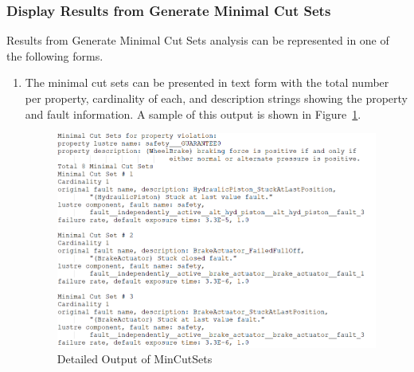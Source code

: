 \subsubsection{Display Results from Generate Minimal Cut Sets}
Results from Generate Minimal Cut Sets analysis can be represented in one of the following forms. 
\begin{enumerate}
\item The minimal cut sets can be presented in text form with the total number per property, cardinality of each, and description strings showing the property and fault information. A sample of this output is shown in Figure~\ref{fig:detailedMCS}. 
\begin{figure}[htbp]
	\hspace*{-2cm}
	\vspace{-0.1in} 
	\begin{center}
		\includegraphics[scale=0.7]{images/wbsMCSDesc.png}
	\caption{Detailed Output of MinCutSets}
		\label{fig:detailedMCS}
	\end{center}
\end{figure}


\end{enumerate}
